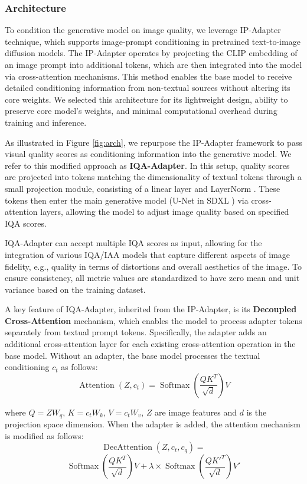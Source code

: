 \subsubsection{Architecture}

To condition the generative model on image quality, we leverage IP-Adapter \cite{ye2023ip-adapter} technique, which supports image-prompt conditioning in pretrained text-to-image diffusion models. The IP-Adapter operates by projecting the CLIP embedding of an image prompt into additional tokens, which are then integrated into the model via cross-attention mechanisms. This method enables the base model to receive detailed conditioning information from non-textual sources without altering its core weights. We selected this architecture for its lightweight design, ability to preserve core model's weights, and minimal computational overhead during training and inference.

As illustrated in Figure \ref{fig:arch}, we repurpose the IP-Adapter framework to pass visual quality scores as conditioning information into the generative model. We refer to this modified approach as \textbf{IQA-Adapter}. In this setup, quality scores are projected into tokens matching the dimensionality of textual tokens through a small projection module, consisting of a linear layer and LayerNorm \cite{ba2016layernormalization}. These tokens then enter the main generative model (U-Net in SDXL \cite{podellsdxl}) via cross-attention layers, allowing the model to adjust image quality based on specified IQA scores.

IQA-Adapter can accept multiple IQA scores as input, allowing for the integration of various IQA/IAA models that capture different aspects of image fidelity, e.g., quality in terms of distortions and overall aesthetics of the image. To ensure consistency, all metric values are standardized to have zero mean and unit variance based on the training dataset.

A key feature of IQA-Adapter, inherited from the IP-Adapter, is its \textbf{Decoupled Cross-Attention} mechanism, which enables the model to process adapter tokens separately from textual prompt tokens. Specifically, the adapter adds an additional cross-attention layer for each existing cross-attention operation in the base model. Without an adapter, the base model processes the textual conditioning \(c_t\) as follows:
$$\operatorname{Attention}(Z, c_t) = \operatorname{Softmax}\left(\frac{Q K^T}{\sqrt{d}}\right) V$$

\noindent where $Q = Z W_q$, $K = c_t W_k$, $V = c_t W_v$, $Z$ are image features and $d$ is the projection space dimension. When the adapter is added, the attention mechanism is modified as follows:
$$\operatorname{DecAttention}(Z, c_t, c_q) = $$
$$\operatorname{Softmax}\left(\frac{Q K^T}{\sqrt{d}}\right) V + \lambda\times\operatorname{Softmax}\left(\frac{Q K'^T}{\sqrt{d}}\right) V' $$

